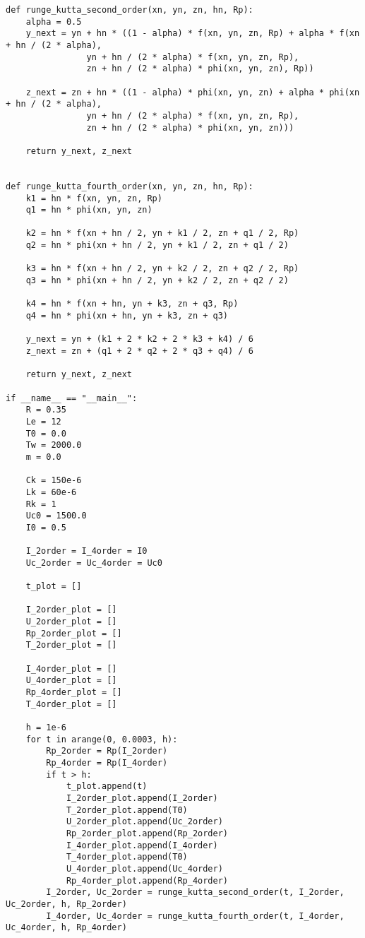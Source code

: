 \documentclass[a4paper, 14pt]{article}
\begin{document}
\begin{lstlisting}[label=some-code,caption=Листинг программы]
def runge_kutta_second_order(xn, yn, zn, hn, Rp):
    alpha = 0.5
    y_next = yn + hn * ((1 - alpha) * f(xn, yn, zn, Rp) + alpha * f(xn + hn / (2 * alpha),
                yn + hn / (2 * alpha) * f(xn, yn, zn, Rp),
                zn + hn / (2 * alpha) * phi(xn, yn, zn), Rp))

    z_next = zn + hn * ((1 - alpha) * phi(xn, yn, zn) + alpha * phi(xn + hn / (2 * alpha),
                yn + hn / (2 * alpha) * f(xn, yn, zn, Rp),
                zn + hn / (2 * alpha) * phi(xn, yn, zn)))

    return y_next, z_next


def runge_kutta_fourth_order(xn, yn, zn, hn, Rp):
    k1 = hn * f(xn, yn, zn, Rp)
    q1 = hn * phi(xn, yn, zn)

    k2 = hn * f(xn + hn / 2, yn + k1 / 2, zn + q1 / 2, Rp)
    q2 = hn * phi(xn + hn / 2, yn + k1 / 2, zn + q1 / 2)

    k3 = hn * f(xn + hn / 2, yn + k2 / 2, zn + q2 / 2, Rp)
    q3 = hn * phi(xn + hn / 2, yn + k2 / 2, zn + q2 / 2)

    k4 = hn * f(xn + hn, yn + k3, zn + q3, Rp)
    q4 = hn * phi(xn + hn, yn + k3, zn + q3)

    y_next = yn + (k1 + 2 * k2 + 2 * k3 + k4) / 6
    z_next = zn + (q1 + 2 * q2 + 2 * q3 + q4) / 6

    return y_next, z_next
    
if __name__ == "__main__":
    R = 0.35
    Le = 12
    T0 = 0.0
    Tw = 2000.0
    m = 0.0

    Ck = 150e-6
    Lk = 60e-6
    Rk = 1
    Uc0 = 1500.0
    I0 = 0.5

    I_2order = I_4order = I0
    Uc_2order = Uc_4order = Uc0

    t_plot = []

    I_2order_plot = []
    U_2order_plot = []
    Rp_2order_plot = []
    T_2order_plot = []

    I_4order_plot = []
    U_4order_plot = []
    Rp_4order_plot = []
    T_4order_plot = []

    h = 1e-6
    for t in arange(0, 0.0003, h):
        Rp_2order = Rp(I_2order)
        Rp_4order = Rp(I_4order)
        if t > h:
            t_plot.append(t)
            I_2order_plot.append(I_2order)
            T_2order_plot.append(T0)
            U_2order_plot.append(Uc_2order)
            Rp_2order_plot.append(Rp_2order)
            I_4order_plot.append(I_4order)
            T_4order_plot.append(T0)
            U_4order_plot.append(Uc_4order)
            Rp_4order_plot.append(Rp_4order)
        I_2order, Uc_2order = runge_kutta_second_order(t, I_2order, Uc_2order, h, Rp_2order)
        I_4order, Uc_4order = runge_kutta_fourth_order(t, I_4order, Uc_4order, h, Rp_4order)
\end{lstlisting}
\end{document}
